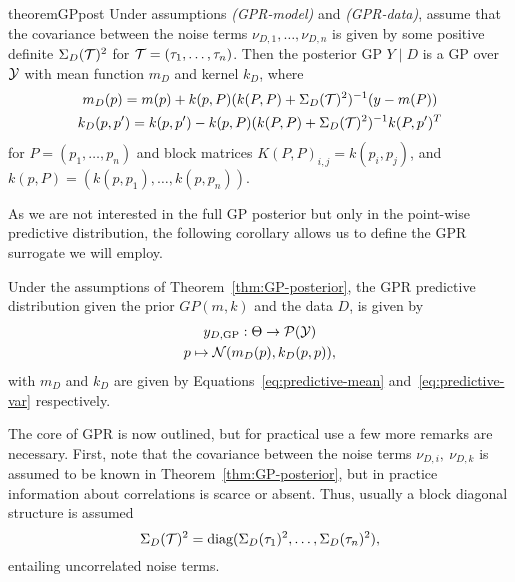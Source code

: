 \begin{restatable}[GP posterior]{theorem}{GPpost} \label{thm:GP-posterior}
    Under assumptions \textit{(GPR-model)} and \textit{(GPR-data)}, assume that the covariance between the noise terms $\nu_{D,1},\dots,\nu_{D,n}$ is given by some positive definite $\Sigma_D(\mathcal T)^2$ for $\mathcal T = (\tau_1, \ldots, \tau_n)$. \newline
    Then the posterior GP $Y \mid D$ is a GP over $\mathcal Y$ with mean function $m_D$ and kernel $k_D$, where
    \begin{gather}
        m_D(p) = m(p) + k(p, P) (k(P,P) + \Sigma_D(\mathcal T)^2 )^{-1} (y - m(P)) \label{eq:predictive-mean} \\
        k_D(p, p') = k(p, p') - k(p, P) (k(P,P) + \Sigma_D(\mathcal T)^2 )^{-1} k(P, p')^T \label{eq:predictive-var}
    \end{gather}
    for $P = (p_1, \ldots, p_n)$ and block matrices $K(P,P)_{i,j} = k(p_i, p_j)$, and $k(p, P) = (k(p, p_1), \ldots, k(p, p_n))$.
\end{restatable}

As we are not interested in the full GP posterior but only in the point-wise predictive distribution, the following corollary allows us to define the GPR surrogate we will employ.
\begin{cor}
    Under the assumptions of Theorem~\ref{thm:GP-posterior}, the GPR predictive distribution given the prior $GP(m,k)$ and the data $D$, is given by 
    \begin{gather*}
        y_{D, \text{GP}} : \Theta \rightarrow \mathcal P( \mathcal Y) \\
        p \mapsto \mathcal N( m_D(p), k_D(p,p) ),
    \end{gather*}
    with $m_D$ and $k_D$ are given by Equations~\eqref{eq:predictive-mean} and~\eqref{eq:predictive-var} respectively.
\end{cor}

The core of GPR is now outlined, but for practical use a few more remarks are necessary. \newline
First, note that the covariance between the noise terms $\nu_{D,i}, \ \nu_{D,k}$ is assumed to be known in Theorem~\ref{thm:GP-posterior}, but in practice information about correlations is scarce or absent. Thus, usually a block diagonal structure is assumed 
\begin{equation} \label{eq:GPR-noise-corr}
    \Sigma_D(\mathcal T)^2 = \text{diag}(\Sigma_D(\tau_1)^2, \ldots, \Sigma_D(\tau_n)^2),
\end{equation}
entailing uncorrelated noise terms.

